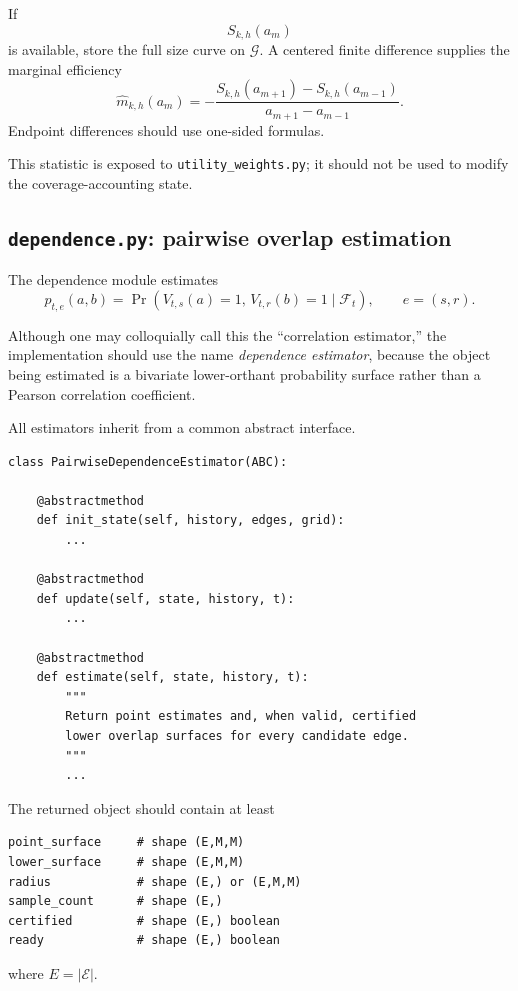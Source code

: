 \documentclass[11pt]{article}
\newcommand{\calF}{\mathcal{F}}
\begin{document}
If
\[
    S_{k,h}(a_m)
\]
is available, store the full size curve on $\mathcal G$.  A centered finite
difference supplies the marginal efficiency
\[
    \widehat m_{k,h}(a_m)
    =
    -
    \frac{
        S_{k,h}(a_{m+1})-S_{k,h}(a_{m-1})
    }{
        a_{m+1}-a_{m-1}
    }.
\]
Endpoint differences should use one-sided formulas.

This statistic is exposed to \texttt{utility\_weights.py}; it should not be
used to modify the coverage-accounting state.

\subsection{\texttt{dependence.py}: pairwise overlap estimation}
\label{app:dependence-module}

The dependence module estimates
\[
    p_{t,e}(a,b)
    =
    \Pr(
        V_{t,s}(a)=1,\,
        V_{t,r}(b)=1
        \mid\calF_t
    ),
    \qquad e=(s,r).
\]

Although one may colloquially call this the ``correlation estimator,'' the
implementation should use the name \emph{dependence estimator}, because the
object being estimated is a bivariate lower-orthant probability surface rather
than a Pearson correlation coefficient.

All estimators inherit from a common abstract interface.

\begin{verbatim}
class PairwiseDependenceEstimator(ABC):

    @abstractmethod
    def init_state(self, history, edges, grid):
        ...

    @abstractmethod
    def update(self, state, history, t):
        ...

    @abstractmethod
    def estimate(self, state, history, t):
        """
        Return point estimates and, when valid, certified
        lower overlap surfaces for every candidate edge.
        """
        ...
\end{verbatim}

The returned object should contain at least

\begin{verbatim}
point_surface     # shape (E,M,M)
lower_surface     # shape (E,M,M)
radius            # shape (E,) or (E,M,M)
sample_count      # shape (E,)
certified         # shape (E,) boolean
ready             # shape (E,) boolean
\end{verbatim}

where $E=|\mathcal E|$.
\end{document}
